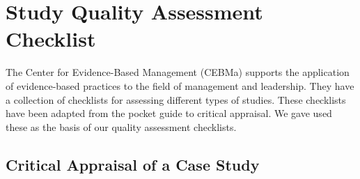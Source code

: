 
\chapter{Study Quality Assessment Checklist} 
\label{appendix:QualityAssesmentChecklist} 
The Center for Evidence-Based Management (CEBMa) supports the application of evidence-based practices to the field of management and leadership.
They have a collection of checklists for assessing different types of studies.
These checklists have been adapted from the pocket guide to critical appraisal\cite{crombie1997pocket}.
We gave used these as the basis of our quality assessment checklists.

\section*{Critical Appraisal of a Case Study}

